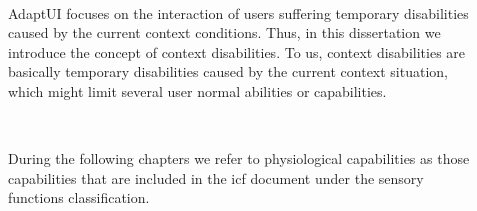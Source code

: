 \begin{description}
  \item[] \hfill \\
  \begin{mdframed}[hidealllines=true,backgroundcolor=gray!20]
  AdaptUI focuses on the interaction of users suffering temporary disabilities 
  caused by the current context conditions. Thus, in this dissertation we 
  introduce the concept of context disabilities. To us, context disabilities 
  are basically temporary disabilities caused by the current context situation, 
  which might limit several user normal abilities or capabilities.
  \end{mdframed}

  \item[] \hfill \\
  \begin{mdframed}[hidealllines=true,backgroundcolor=gray!20]
  During the following chapters we refer to physiological capabilities as those 
  capabilities that are included in the \ac{icf} document under the sensory 
  functions classification.
  \end{mdframed}
 
\end{description}

\newpage
 
